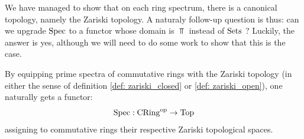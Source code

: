             We have managed to show that on each ring spectrum, there is a canonical topology, namely the Zariski topology. A naturaly follow-up question is thus: can we upgrade $\mathrm{Spec}$ to a functor whose domain is $\Top$ instead of $\mathrm{Sets}$ ? Luckily, the answer is yes, although we will need to do some work to show that this is the case. 
            \begin{proposition} \label{prop: continuous_functions_between_spectra}
                By equipping prime spectra of commutative rings with the Zariski topology (in either the sense of definition \ref{def: zariski_closed} or \ref{def: zariski_open}), one naturally gets a functor:
                    $$\mathrm{Spec}: \mathrm{CRing}^{\mathrm{op}} \to \mathrm{Top}$$
                assigning to commutative rings their respective Zariski topological spaces.
            \end{proposition}
